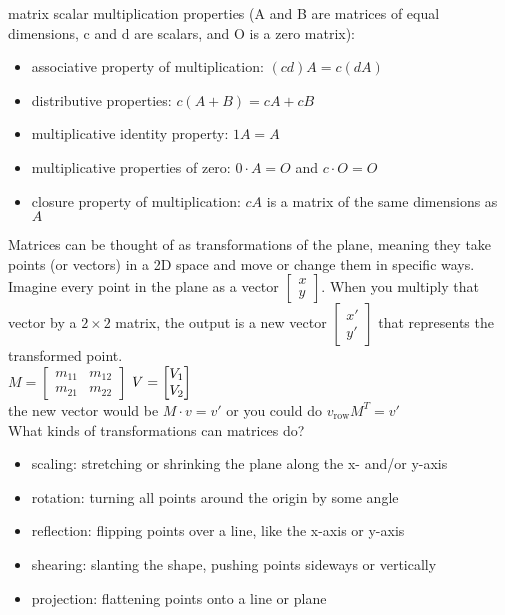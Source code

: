 \documentclass{article}
\begin{document}
matrix scalar multiplication properties (A and B are matrices of equal dimensions, c and d are scalars, and O is a zero matrix):
	\begin{itemize}
		\item associative property of multiplication: $(cd)A = c(dA)$
		\item distributive properties: $c(A + B) = cA + cB$
		\item multiplicative identity property: $1A = A$
		\item multiplicative properties of zero: $0 \cdot A = O$ and $c \cdot O = O$
		\item closure property of multiplication: $cA$ is a matrix of the same dimensions as $A$
	\end{itemize}

Matrices can be thought of as transformations of the plane, meaning they take points (or vectors) in a 2D space and move or change them in specific ways. Imagine every point in the plane as a vector $
\begin{bmatrix}
x\\
y
\end{bmatrix}
$. When you multiply that vector by a $2 \times 2$ matrix, the output is a new vector $
\begin{bmatrix}
x'\\
y'
\end{bmatrix}$ that represents the transformed point.\\

$
M =
\begin{bmatrix}
	m_{11} & m_{12}\\
	m_{21} & m_ {22}
\end{bmatrix}
$
$
V =
\begin{bmatrix}
V_1 \\
V_2
\end{bmatrix}\\
$\\

the new vector would be $M \cdot v = v'$ or you could do $v_{\text{row}}M^T = v'$\\

What kinds of transformations can matrices do?
	\begin{itemize}
		\item scaling: stretching or shrinking the plane along the x- and/or y-axis
		\item rotation: turning all points around the origin by some angle
		\item reflection: flipping points over a line, like the x-axis or y-axis
		\item shearing: slanting the shape, pushing points sideways or vertically
		\item projection: flattening points onto a line or plane
	\end{itemize}
\end{document}
